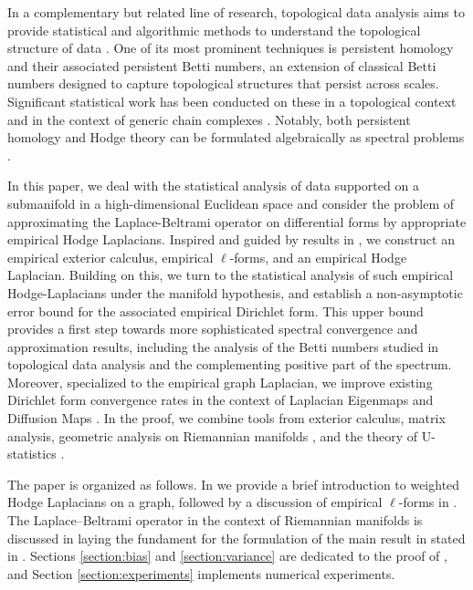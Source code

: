 \documentclass[10pt]{article}
\theoremstyle{plain}
\theoremstyle{definition}
\theoremstyle{remark}
\begin{document}
In a complementary but related line of research, topological data analysis aims to provide statistical and algorithmic methods to understand the topological structure of data \cite{BCY18}. One of its most prominent techniques is persistent homology \cite{Edelsbrunner02} and their associated persistent Betti numbers, an extension of classical Betti numbers designed to capture topological structures that persist across scales. Significant statistical work has been conducted on these in a topological context \cite{Bubenik07} and in the context of generic chain complexes \cite{Ginzburg17}. Notably, both persistent homology and Hodge theory can be formulated algebraically as spectral problems \cite{Usher16}.

In this paper, we deal with the statistical analysis of data supported on a submanifold in a high-dimensional Euclidean space and consider the problem of approximating the Laplace-Beltrami operator on differential forms by appropriate empirical Hodge Laplacians. Inspired and guided by results in \cite{Lim11,Smale12,Lim20,HK24}, we construct an empirical exterior calculus, empirical $\ell$-forms, and an empirical Hodge Laplacian. Building on this, we turn to the statistical analysis of such empirical Hodge-Laplacians under the manifold hypothesis, and establish a non-asymptotic error bound for the associated empirical Dirichlet form. This upper bound provides a first step towards more sophisticated spectral convergence and approximation results, including the analysis of the Betti numbers studied in topological data analysis and the complementing positive part of the spectrum. Moreover, specialized to the empirical graph Laplacian, we improve existing Dirichlet form convergence rates in the context of Laplacian Eigenmaps and Diffusion Maps \cite{MR4130541,MR4491976}. In the proof, we combine tools from exterior calculus, matrix analysis, geometric analysis on Riemannian manifolds \cite{Gri09}, and the theory of U-statistics \cite{Mins24}.  

The paper is organized as follows. In  we provide a brief introduction to weighted Hodge Laplacians on a graph, followed by a discussion of empirical $\ell$-forms in . The Laplace--Beltrami operator in the context of Riemannian manifolds is discussed in  laying the fundament for the formulation of the main result in  stated in . Sections \ref{section:bias} and \ref{section:variance} are dedicated to the proof of , and Section \ref{section:experiments} implements numerical experiments.
\end{document}
